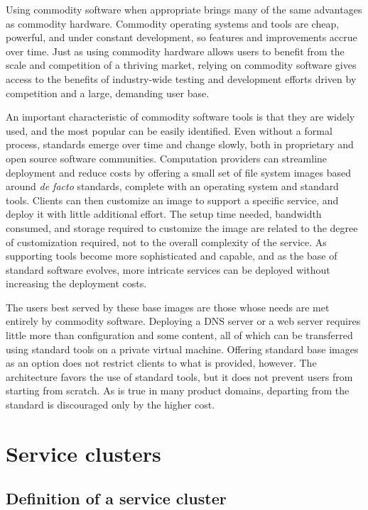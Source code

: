 Using commodity software when appropriate brings many of the same advantages as commodity hardware. Commodity operating systems and tools are cheap, powerful, and under constant development, so features and improvements accrue over time. Just as using commodity hardware allows users to benefit from the scale and competition of a thriving market, relying on commodity software gives access to the benefits of industry-wide testing and development efforts driven by competition and a large, demanding user base.

An important characteristic of commodity software tools is that they are widely used, and the most popular can be easily identified. Even without a formal process, standards emerge over time and change slowly, both in proprietary and open source software communities. Computation providers can streamline deployment and reduce costs by offering a small set of file system images based around \emph{de facto} standards, complete with an operating system and standard tools. Clients can then customize an image to support a specific service, and deploy it with little additional effort. The setup time needed, bandwidth consumed, and storage required to customize the image are related to the degree of customization required, not to the overall complexity of the service. As supporting tools become more sophisticated and capable, and as the base of standard software evolves, more intricate services can be deployed without increasing the deployment costs.

The users best served by these base images are those whose needs are met entirely by commodity software. Deploying a DNS server or a web server requires little more than configuration and some content, all of which can be transferred using standard tools on a private virtual machine. Offering standard base images as an option does not restrict clients to what is provided, however. The architecture favors the use of standard tools, but it does not prevent users from starting from scratch. As is true in many product domains, departing from the standard is discouraged only by the higher cost.

\section{Service clusters}

\subsection{Definition of a service cluster}

